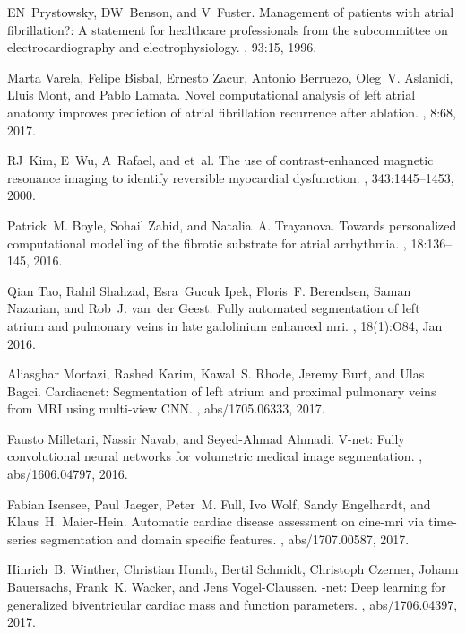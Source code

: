 \documentclass{llncs}
\begin{document}
\begin{thebibliography}{10}

EN~Prystowsky, DW~Benson, and V~Fuster.
\newblock Management of patients with atrial fibrillation?: A statement for
  healthcare professionals from the subcommittee on electrocardiography and
  electrophysiology.
, 93:15, 1996.

Marta Varela, Felipe Bisbal, Ernesto Zacur, Antonio Berruezo, Oleg~V. Aslanidi,
  Lluis Mont, and Pablo Lamata.
\newblock Novel computational analysis of left atrial anatomy improves
  prediction of atrial fibrillation recurrence after ablation.
, 8:68, 2017.

RJ~Kim, E~Wu, A~Rafael, and et~al.
\newblock The use of contrast‐enhanced magnetic resonance imaging to identify
  reversible myocardial dysfunction.
, 343:1445--1453, 2000.

Patrick~M. Boyle, Sohail Zahid, and Natalia~A. Trayanova.
\newblock Towards personalized computational modelling of the fibrotic
  substrate for atrial arrhythmia.
, 18:136--145, 2016.

Qian Tao, Rahil Shahzad, Esra~Gucuk Ipek, Floris~F. Berendsen, Saman Nazarian,
  and Rob~J. van~der Geest.
\newblock Fully automated segmentation of left atrium and pulmonary veins in
  late gadolinium enhanced mri.
, 18(1):O84, Jan
  2016.

Aliasghar Mortazi, Rashed Karim, Kawal~S. Rhode, Jeremy Burt, and Ulas Bagci.
\newblock Cardiacnet: Segmentation of left atrium and proximal pulmonary veins
  from {MRI} using multi-view {CNN}.
, abs/1705.06333, 2017.

Fausto Milletari, Nassir Navab, and Seyed{-}Ahmad Ahmadi.
\newblock V-net: Fully convolutional neural networks for volumetric medical
  image segmentation.
, abs/1606.04797, 2016.

Fabian Isensee, Paul Jaeger, Peter~M. Full, Ivo Wolf, Sandy Engelhardt, and
  Klaus~H. Maier{-}Hein.
\newblock Automatic cardiac disease assessment on cine-mri via time-series
  segmentation and domain specific features.
, abs/1707.00587, 2017.

Hinrich~B. Winther, Christian Hundt, Bertil Schmidt, Christoph Czerner, Johann
  Bauersachs, Frank~K. Wacker, and Jens Vogel{-}Claussen.
\newblock{\textdollar}{\(\nu\)}{\textdollar}-net: Deep learning for
  generalized biventricular cardiac mass and function parameters.
, abs/1706.04397, 2017.


\end{thebibliography}
\end{document}
